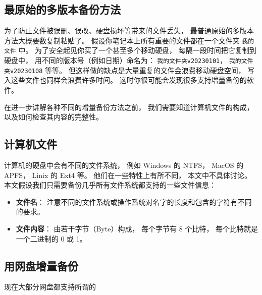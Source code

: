 
\subsection{最原始的多版本备份方法}
为了防止文件被误删、误改、硬盘损坏等带来的文件丢失， 最普通原始的多版本方法大概要数复制粘贴了。 假设你笔记本上所有重要的文件都在一个文件夹 \verb|我的文件| 中。 为了安全起见你买了一个甚至多个移动硬盘， 每隔一段时间把它复制到硬盘中， 用不同的版本号（例如日期）命名为： \verb|我的文件夹v20230101|， \verb|我的文件夹v20230108| 等等。 但这样做的缺点是大量重复的文件会浪费移动硬盘空间， 写入这些文件也同样会浪费许多时间。 这时你很可能会发现很多支持增量备份的软件。

在进一步讲解各种不同的增量备份方法之前， 我们需要知道计算机文件的构成， 以及如何检查其内容的完整性。

\subsection{计算机文件}
计算机的硬盘中会有不同的文件系统， 例如 Windows 的 NTFS， MacOS 的 APFS， Linix 的 Ext4 等。 他们在一些特性上有所不同， 本文中不具体讨论。 本文假设我们只需要备份几乎所有文件系统都支持的一些文件信息：
\begin{itemize}
\item \textbf{文件名}： 注意不同的文件系统或操作系统对名字的长度和包含的字符有不同的要求。
\item \textbf{文件内容}： 由若干字节（Byte）构成， 每个字节有 8 个比特， 每个比特就是一个二进制的 0 或 1。
\end{itemize}



\subsection{用网盘增量备份}
现在大部分网盘都支持所谓的
